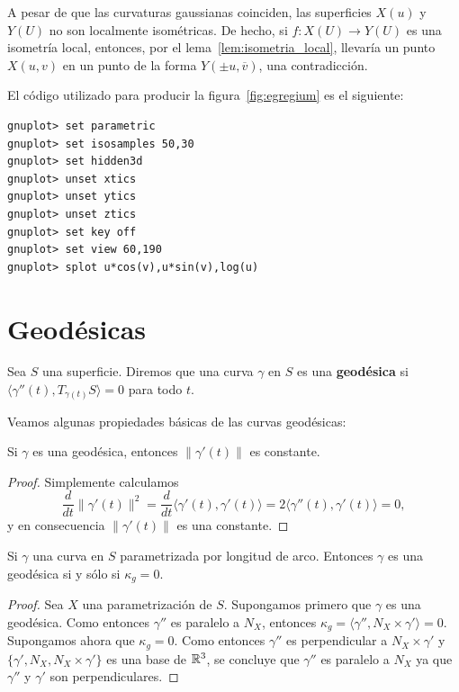 \begin{example}
	A pesar de que las curvaturas gaussianas coinciden, las
	superficies $X(u)$ y $Y(U)$ no son localmente isométricas. De hecho, si
	$f\colon X(U)\to Y(U)$ es una isometría local, entonces, por el
	lema~\ref{lem:isometria_local}, llevaría 
	un punto $X(u,v)$ en un punto de la forma $Y(\pm u,\overline{v})$, una contradicción.
		

	El código utilizado para producir la figura~\ref{fig:egregium} es el
	siguiente:
\begin{lstlisting}
gnuplot> set parametric
gnuplot> set isosamples 50,30
gnuplot> set hidden3d
gnuplot> unset xtics
gnuplot> unset ytics
gnuplot> unset ztics
gnuplot> set key off
gnuplot> set view 60,190
gnuplot> splot u*cos(v),u*sin(v),log(u)
\end{lstlisting}

\end{example}
\chapter{Geodésicas}

\begin{definition}
	Sea $S$ una superficie. 
	Diremos que una curva $\gamma$ en $S$ es una \textbf{geodésica} si
	$\langle\gamma''(t),T_{\gamma(t)}S\rangle=0$ para todo $t$.
\end{definition}

Veamos algunas propiedades básicas de las curvas geodésicas:

\begin{proposition}
	Si $\gamma$ es una geodésica, entonces $\|\gamma'(t)\|$ es constante. 
\end{proposition}

\begin{proof}
	Simplemente calculamos
	\[
		\frac{d}{dt}\|\gamma'(t)\|^2=\frac{d}{dt}\langle \gamma'(t),\gamma'(t)\rangle=2\langle \gamma''(t),\gamma'(t)\rangle=0,
	\]
	y en consecuencia $\|\gamma'(t)\|$ es una constante.
\end{proof}

\begin{proposition}
	Si $\gamma$ una curva en $S$ parametrizada por longitud de arco. Entonces
	$\gamma$ es una geodésica si y sólo si $\kappa_g=0$.
\end{proposition}

\begin{proof}
	Sea $X$ una parametrización de $S$. Supongamos primero que $\gamma$ es una
	geodésica. Como entonces $\gamma''$ es paralelo a $N_X$, entonces
	$\kappa_g=\langle\gamma'',N_X\times\gamma'\rangle=0$. Supongamos ahora que
	$\kappa_g=0$. Como entonces $\gamma''$ es perpendicular a
	$N_X\times\gamma'$ y $\{\gamma',N_X,N_X\times\gamma'\}$ es una base de
	$\mathbb{R}^3$, se concluye que $\gamma''$ es paralelo a $N_X$ ya que $\gamma''$ y
	$\gamma'$ son perpendiculares.
\end{proof}

